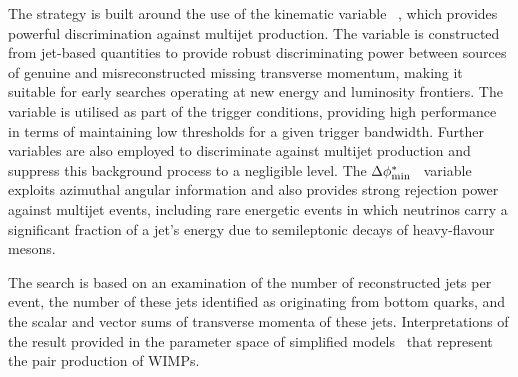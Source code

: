 The strategy is built around the use of the kinematic variable
\alphat~\cite{Randall:2008rw, RA1Paper}, which provides powerful
discrimination against multijet production. The \alphat variable is
constructed from jet-based quantities to provide robust discriminating
power between sources of genuine and misreconstructed missing
transverse momentum, making it suitable for early searches operating
at new energy and luminosity frontiers. The \alphat variable is
utilised as part of the trigger conditions, providing high performance
in terms of maintaining low thresholds for a given trigger
bandwidth. Further variables are also employed to discriminate against
multijet production and suppress this background process to a
negligible level. The $\Delta\phi^{*}_{\rm min}$~\cite{RA1Paper}
variable exploits azimuthal angular information and also provides
strong rejection power against multijet events, including rare
energetic events in which neutrinos carry a significant fraction of a
jet's energy due to semileptonic decays of heavy-flavour mesons.


The search is based on an examination of the number of reconstructed
jets per event, the number of these jets identified as originating
from bottom quarks, and the scalar and vector sums of transverse
momenta of these jets. 
Interpretations of the result %
 provided in the parameter space of simplified
models~\cite{Alwall:2008ag, Alwall:2008va, sms} that represent the
pair production of WIMPs.

